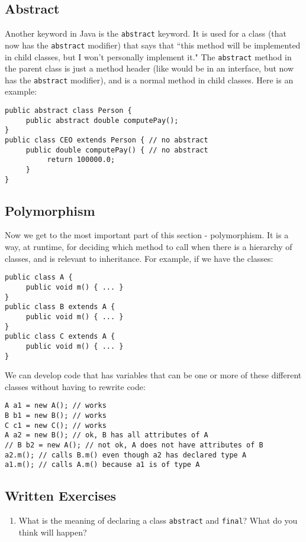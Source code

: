 \subsection{Abstract}
Another keyword in Java is the \verb|abstract| keyword. It is used for a class (that now has the \verb|abstract| modifier) that says that ``this method will be implemented in child classes, but I won't personally implement it." The \verb|abstract| method in the parent class is just a method header (like would be in an interface, but now has the \verb|abstract| modifier), and is a normal method in child classes. Here is an example:
\begin{lstlisting}
public abstract class Person {
     public abstract double computePay();
}
public class CEO extends Person { // no abstract
     public double computePay() { // no abstract
          return 100000.0;
     }
}
\end{lstlisting}

\subsection{Polymorphism}
Now we get to the most important part of this section - polymorphism. It is a way, at runtime, for deciding which method to call when there is a hierarchy of classes, and is relevant to inheritance. For example, if we have the classes:
\begin{lstlisting}
public class A {
     public void m() { ... }
}
public class B extends A {
     public void m() { ... }
}
public class C extends A {
     public void m() { ... }
}
\end{lstlisting}
We can develop code that has variables that can be one or more of these different classes without having to rewrite code:
\begin{lstlisting}
A a1 = new A(); // works
B b1 = new B(); // works
C c1 = new C(); // works
A a2 = new B(); // ok, B has all attributes of A
// B b2 = new A(); // not ok, A does not have attributes of B
a2.m(); // calls B.m() even though a2 has declared type A
a1.m(); // calls A.m() because a1 is of type A
\end{lstlisting}

\subsection{Written Exercises}
\setcounter{counter}{1}
\begin{enumerate}[label={\arabic{counter}\addtocounter{counter}{1}}.]
\item What is the meaning of declaring a class \verb|abstract| and \verb|final|? What do you think will happen?
\end{enumerate}